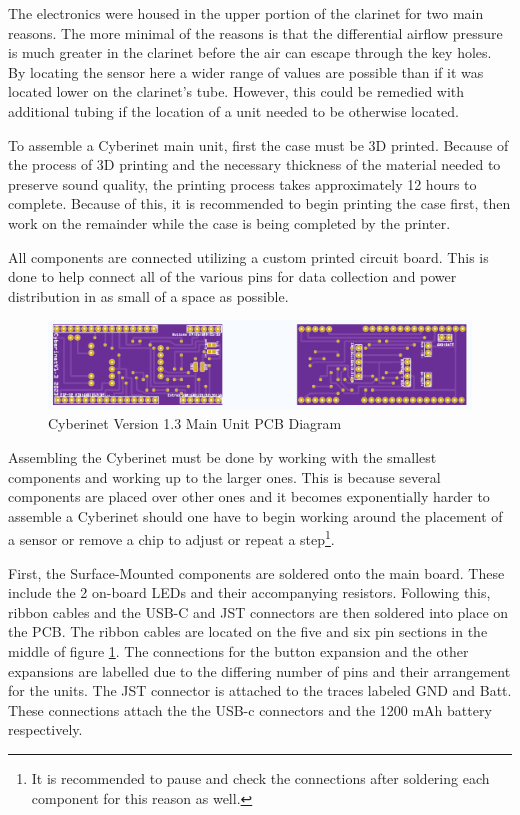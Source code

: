 The electronics were housed in the upper portion of the clarinet for two main reasons. The more minimal of the reasons is that the differential airflow pressure is much greater in the clarinet before the air can escape through the key holes. By locating the sensor here a wider range of values are possible than if it was located lower on the clarinet's tube. However, this could be remedied with additional tubing if the location of a unit needed to be otherwise located.

To assemble a Cyberinet main unit, first the case must be 3D printed. Because of the process of 3D printing and the necessary thickness of the material needed to preserve sound quality, the printing process takes approximately 12 hours to complete. Because of this, it is recommended to begin printing the case first, then work on the remainder while the case is being completed by the printer.

All components are connected utilizing a custom printed circuit board. This is done to help connect all of the various pins for data collection and power distribution in as small of a space as possible. 

\begin{center}
    \begin{figure}
        \centering
        \includegraphics[scale=0.6]{diagrams/PCBs/cyberinetPCB.png}
        \caption{Cyberinet Version 1.3  Main Unit PCB Diagram}
        \label{fig:mainUnitPCB}
    \end{figure}
\end{center}

Assembling the Cyberinet must be done by working with the smallest components and working up to the larger ones. This is because several components are placed over other ones and it becomes exponentially harder to assemble a Cyberinet should one have to begin working around the placement of a sensor or remove a chip to adjust or repeat a step\footnote{It is recommended to pause and check the connections after soldering each component for this reason as well.}.

First, the Surface-Mounted components are soldered onto the main board. These include the 2 on-board LEDs and their accompanying resistors. Following this, ribbon cables and the USB-C and JST connectors are then soldered into place on the PCB. The ribbon cables are located on the five and six pin sections in the middle of figure \ref{fig:mainUnitPCB}. The connections for the button expansion and the other expansions are labelled due to the differing number of pins and their arrangement for the units. The JST connector is attached to the traces labeled GND and Batt. These connections attach the the USB-c connectors and the 1200 mAh battery respectively.

